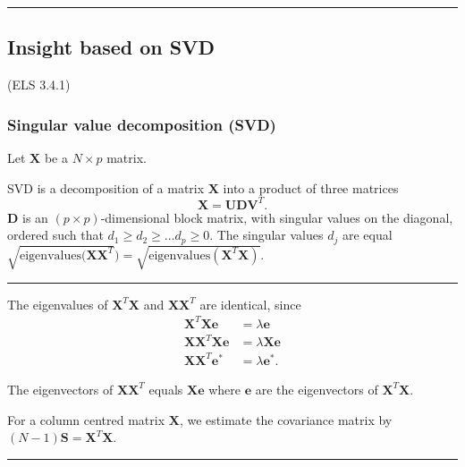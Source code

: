 \documentclass[
  letterpaper,
  DIV=11,
  numbers=noendperiod]{scrartcl}
\begin{document}
\begin{center}\rule{0.5\linewidth}{0.5pt}\end{center}

\hypertarget{insight-based-on-svd}{%
\subsection{Insight based on SVD}\label{insight-based-on-svd}}

(ELS 3.4.1)

\hypertarget{singular-value-decomposition-svd}{%
\subsubsection{Singular value decomposition
(SVD)}\label{singular-value-decomposition-svd}}

Let \({\mathbf X}\) be a \(N \times p\) matrix.

SVD is a decomposition of a matrix \({\mathbf X}\) into a product of
three matrices \[{\mathbf X}={\mathbf U}{\mathbf D}{\mathbf V}^T.\]
\({\mathbf D}\) is an \((p \times p)\)-dimensional block matrix, with
singular values on the diagonal, ordered such that
\(d_1 \ge d_2 \ge \ldots d_p \ge 0\). The singular values \(d_j\) are
equal
\(\sqrt{\mathrm{eigenvalues}({\mathbf X}{\mathbf X}^T})=\sqrt{\mathrm{eigenvalues}({\mathbf X}^T{\mathbf X})}\).

\begin{center}\rule{0.5\linewidth}{0.5pt}\end{center}

The eigenvalues of \({\mathbf X}^T{\mathbf X}\) and
\({\mathbf X}{\mathbf X}^T\) are identical, since \begin{align*}
        {\mathbf X}^T{\mathbf X} \mathbf{e} &= \lambda \mathbf{e} \\
        {\mathbf X}{\mathbf X}^T{\mathbf X} \mathbf{e} &= \lambda {\mathbf X}\mathbf{e}\\
        {\mathbf X}{\mathbf X}^T\mathbf{e}^* &= \lambda \mathbf{e}^*.
\end{align*}

The eigenvectors of \({\mathbf X}{\mathbf X}^T\) equals
\({\mathbf X} \mathbf{e}\) where \(\mathbf{e}\) are the eigenvectors of
\({\mathbf X}^T{\mathbf X}\).

For a column centred matrix \({\mathbf X}\), we estimate the covariance
matrix by \((N-1)\mathbf{S}={\mathbf X}^T{\mathbf X}\).

\begin{center}\rule{0.5\linewidth}{0.5pt}\end{center}
\end{document}
